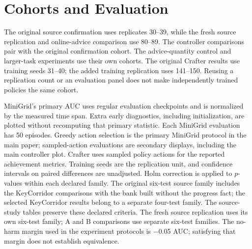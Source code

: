 \section{Cohorts and Evaluation}\label{app:section4_details}

The original source confirmation uses replicates 30--39, while the fresh
source replication and online-advice comparison use 80--89. The
controller comparisons pair with the original confirmation cohort. The
advice-quantity control and larger-task experiments use their own
cohorts. The original Crafter results use training seeds 31--40; the
added training replication uses 141--150. Reusing a replication count or
an evaluation panel does not make independently trained policies the
same cohort.

MiniGrid's primary AUC uses regular evaluation checkpoints and is
normalized by the measured time span. Extra early diagnostics, including
initialization, are plotted without recomputing that primary statistic.
Each MiniGrid evaluation has 50 episodes. Greedy action selection is the
primary MiniGrid protocol in the main paper; sampled-action evaluations
are secondary displays, including the main controller plot. Crafter uses sampled policy
actions for the reported achievement metrics. Training seeds are the
replication unit, and confidence intervals on paired differences are
unadjusted. Holm correction is applied to \(p\)-values within each
declared family. The original six-test source family includes the
KeyCorridor comparisons with the bank built without the progress fact;
the selected KeyCorridor results belong to a separate four-test family. The source-study tables
preserve these declared criteria. The fresh source replication uses its
own six-test family; A and B comparisons use separate six-test families.
The no-harm margin used in the experiment protocols is \ensuremath{-}0.05 AUC;
satisfying that margin does not establish equivalence.

